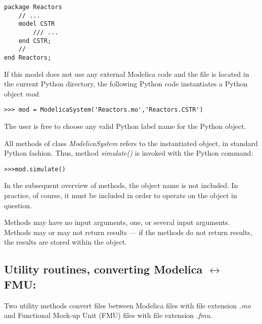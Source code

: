 \begin{lstlisting}
package Reactors
	// ...
	model CSTR
		/// ...
	end CSTR;
	//
end Reactors;
\end{lstlisting}

If this model does not use any external Modelica code and the file is located in the current Python directory, the following
Python code instantiates a Python object \textit{mod}:

\begin{lstlisting}
>>> mod = ModelicaSystem('Reactors.mo','Reactors.CSTR')
\end{lstlisting}

The user is free to choose any valid Python label name for the Python object.

All methods of class \textit{ModelicaSystem} refers to the instantiated object, in standard Python fashion. Thus, method
\textit{simulate()} is invoked with the Python command:

\begin{lstlisting}
>>>mod.simulate()
\end{lstlisting}

In the subsequent overview of methods, the object name is not included. In practice, of course, it must be included in order
to operate on the object in question.

Methods may have no input arguments, one, or several input arguments. Methods may or may not return results — if the methods 
do not return results, the results are stored within the object.

\subsection{Utility routines, converting Modelica $\leftrightarrow$ FMU:}
\label{subsec:pythonmodelicafmu}
Two utility methods convert files between Modelica files with file extension \textit{.mo} and Functional Mock-up Unit (FMU) files with
file extension \textit{.fmu}.

